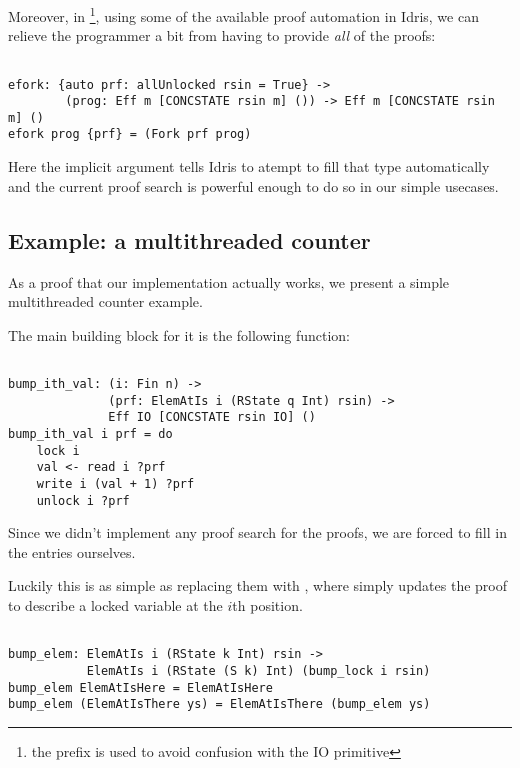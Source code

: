 Moreover, in \footnote{the  prefix is used to avoid
confusion with the IO primitive }, using some of the available proof
automation in Idris, we can relieve the programmer a bit from having to provide
\emph{all} of the proofs:

\begin{BVerbatim}

efork: {auto prf: allUnlocked rsin = True} ->
        (prog: Eff m [CONCSTATE rsin m] ()) -> Eff m [CONCSTATE rsin m] ()
efork prog {prf} = (Fork prf prog)

\end{BVerbatim}

Here the implicit argument  tells Idris to atempt to
fill that type automatically and the current proof search is powerful enough to
do so in our simple usecases.

\subsection{Example: a multithreaded counter}

As a proof that our implementation actually works, we present a simple
multithreaded counter example.

The main building block for it is the following function:

\begin{BVerbatim}

bump_ith_val: (i: Fin n) ->
              (prf: ElemAtIs i (RState q Int) rsin) ->
              Eff IO [CONCSTATE rsin IO] ()
bump_ith_val i prf = do
    lock i
    val <- read i ?prf
    write i (val + 1) ?prf
    unlock i ?prf

\end{BVerbatim}

Since we didn't implement any proof search for the  proofs,
we are forced to fill in the  entries ourselves.

Luckily this is as simple as replacing them with ,
where  simply updates the  proof to describe
a locked variable at the $i$th position.

\begin{BVerbatim}

bump_elem: ElemAtIs i (RState k Int) rsin ->
           ElemAtIs i (RState (S k) Int) (bump_lock i rsin)
bump_elem ElemAtIsHere = ElemAtIsHere
bump_elem (ElemAtIsThere ys) = ElemAtIsThere (bump_elem ys)

\end{BVerbatim}

